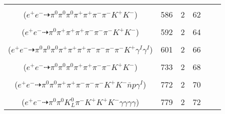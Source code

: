 \documentclass[landscape]{article}
\newcounter{rownumbers}
\newcommand\rn{\stepcounter{rownumbers}\arabic{rownumbers}}
\newcommand{\EOL}{\\} %
\newcommand{\topoTags}[1]{#1} %
\begin{document}
\begin{longtable}{clcccc}
\rn & \makecell[l]{ $ 
e^{+} e^{-} \rightarrow \pi^{0} \pi^{0} \pi^{+} \pi^{-} \rho^{+} K^{*} K^{-} ,
\rho^{+} \rightarrow \pi^{0} \pi^{+} ,
K^{*} \rightarrow \pi^{-} K^{+} 
$ \\ ($
e^{+} e^{-} \dashrightarrow \pi^{0} \pi^{0} \pi^{0} \pi^{+} \pi^{+} \pi^{-} \pi^{-} K^{+} K^{-} 
$) } & \topoTags{586 & }2 & 62 \EOL

\rn & \makecell[l]{ $ 
e^{+} e^{-} \rightarrow \pi^{+} \pi^{+} \pi^{-} \pi^{-} \omega K^{+} K^{-} ,
\omega \rightarrow \pi^{0} \pi^{+} \pi^{-} 
$ \\ ($
e^{+} e^{-} \dashrightarrow \pi^{0} \pi^{+} \pi^{+} \pi^{+} \pi^{-} \pi^{-} \pi^{-} K^{+} K^{-} 
$) } & \topoTags{592 & }2 & 64 \EOL

\rn & \makecell[l]{ $ 
e^{+} e^{-} \rightarrow \pi^{0} \pi^{0} \pi^{+} \pi^{-} \pi^{-} \omega \bar{K}^{0} K^{+} \gamma^{I} \gamma^{I} ,
\omega \rightarrow \pi^{0} \pi^{+} \pi^{-} ,
\bar{K}^{0} \rightarrow K_{S}^{0} ,
K_{S}^{0} \rightarrow \pi^{+} \pi^{-} 
$ \\ ($
e^{+} e^{-} \dashrightarrow \pi^{0} \pi^{0} \pi^{0} \pi^{+} \pi^{+} \pi^{+} \pi^{-} \pi^{-} \pi^{-} \pi^{-} K^{+} \gamma^{I} \gamma^{I} 
$) } & \topoTags{601 & }2 & 66 \EOL

\rn & \makecell[l]{ $ 
e^{+} e^{-} \rightarrow \pi^{0} \pi^{+} \rho^{-} \omega K^{+} K^{-} ,
\rho^{-} \rightarrow \pi^{0} \pi^{-} ,
\omega \rightarrow \pi^{0} \pi^{+} \pi^{-} 
$ \\ ($
e^{+} e^{-} \dashrightarrow \pi^{0} \pi^{0} \pi^{0} \pi^{+} \pi^{+} \pi^{-} \pi^{-} K^{+} K^{-} 
$) } & \topoTags{733 & }2 & 68 \EOL

\rn & \makecell[l]{ $ 
e^{+} e^{-} \rightarrow \pi^{0} \pi^{-} \pi^{-} \omega K^{+} K^{-} \bar{\Delta}^{+} p \gamma^{I} ,
\omega \rightarrow \pi^{0} \pi^{+} \pi^{-} ,
\bar{\Delta}^{+} \rightarrow \pi^{+} \bar{n} 
$ \\ ($
e^{+} e^{-} \dashrightarrow \pi^{0} \pi^{0} \pi^{+} \pi^{+} \pi^{-} \pi^{-} \pi^{-} K^{+} K^{-} \bar{n} p \gamma^{I} 
$) } & \topoTags{772 & }2 & 70 \EOL

\rn & \makecell[l]{ $ 
e^{+} e^{-} \rightarrow \rho^{-} \eta \eta \bar{K}^{0} K^{+} K^{-} K^{*+} ,
\rho^{-} \rightarrow \pi^{0} \pi^{-} ,
\eta \rightarrow \gamma \gamma ,
\eta \rightarrow \gamma \gamma ,
\bar{K}^{0} \rightarrow K_{L}^{0} ,
K^{*+} \rightarrow \pi^{0} K^{+} 
$ \\ ($
e^{+} e^{-} \dashrightarrow \pi^{0} \pi^{0} K_{L}^{0} \pi^{-} K^{+} K^{+} K^{-} \gamma \gamma \gamma \gamma 
$) } & \topoTags{779 & }2 & 72 \EOL


\end{longtable}
\end{document}
